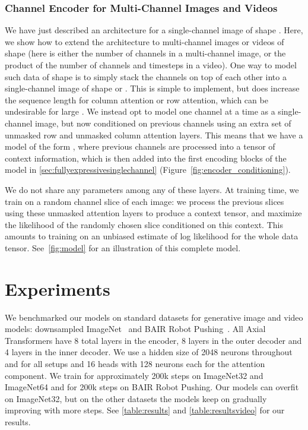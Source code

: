 \documentclass{article} \usepackage{iclr2020_conference,times}
\begin{document}
\subsubsection{Channel Encoder for Multi-Channel Images and Videos}
\label{sec:multichannel}

We have just described an architecture for a single-channel image of shape . Here, we show how to extend the architecture to multi-channel images or videos of shape  (here  is either the number of channels in a multi-channel image, or the product of the number of channels and timesteps in a video).
One way to model such data of shape  is to simply stack the channels on top of each other into a single-channel image of shape  or . This is simple to implement, but does increase the sequence length for column attention or row attention, which can be undesirable for large .
We instead opt to model one channel at a time as a single-channel image, but now conditioned on previous channels using an extra set of unmasked row and unmasked column attention layers. This means that we have a model of the form , where previous channels  are processed into a  tensor of context information, which is then added into the first encoding blocks of the model in \cref{sec:fullyexpressivesinglechannel} (Figure~\ref{fig:encoder_conditioning}).


We do not share any parameters among any of these layers. At training time, we train on a random channel slice of each image: we process the previous slices using these unmasked attention layers to produce a context tensor, and maximize the likelihood of the randomly chosen slice conditioned on this context. This amounts to training on an unbiased estimate of log likelihood for the whole data tensor. See~\cref{fig:model} for an illustration of this complete model.


\FloatBarrier

\section{Experiments}
\label{sec:experiments}

We benchmarked our models on standard datasets for generative image and video models: downsampled ImageNet~\citep{oord2016pixel} and BAIR Robot Pushing~\citep{ebert2017self}. All Axial Transformers have 8 total layers in the encoder, 8 layers in the outer decoder and 4 layers in the inner decoder. We use a hidden size of 2048 neurons throughout and for all setups and 16 heads with 128 neurons each for the attention component. We train for approximately 200k steps on ImageNet32 and ImageNet64 and for 200k steps on BAIR Robot Pushing. Our models can overfit on ImageNet32, but on the other datasets the models keep on gradually improving with more steps. See \cref{table:results} and \cref{table:resultsvideo} for our results.
\end{document}
